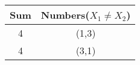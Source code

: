 \begin{tabular}{|c|c|}\hline
  Sum & Numbers($X_1 \neq X_2 $)  \\\hline
  4 & (1,3)  \\\hline
  4 & (3,1) \\\hline
\end{tabular} 
